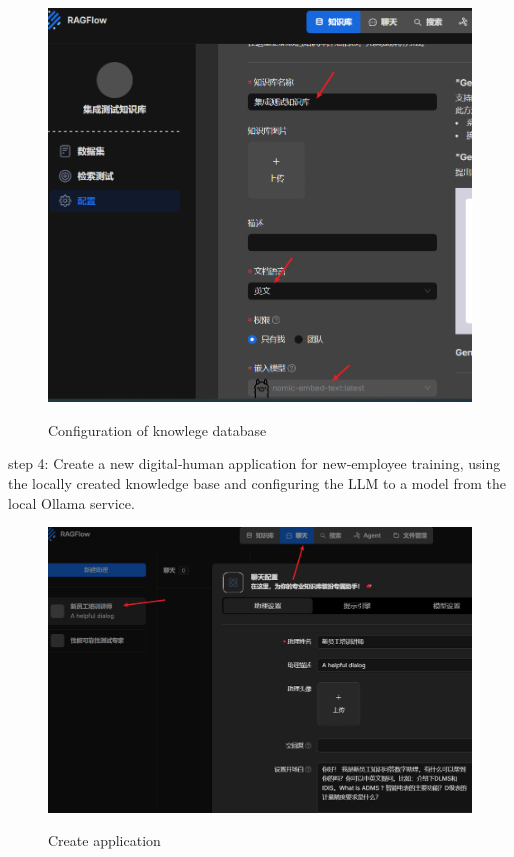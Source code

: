\begin{figure}[H]
    \begin{center}
        \includegraphics[width=.95\linewidth]{res/ragflow-embeded.png}\\
        \caption{Configuration of knowlege database }\label{ragflow-embeded}
    \end{center}
\end{figure}

step 4: Create a new digital‑human application for new‑employee training, using the locally created knowledge base and configuring the LLM to a model from the local Ollama service.

\begin{figure}[H]
    \begin{center}
        \includegraphics[width=.95\linewidth]{res/ragflow-app.png}\\
        \caption{Create application }\label{ragflow-app}
    \end{center}
\end{figure}

